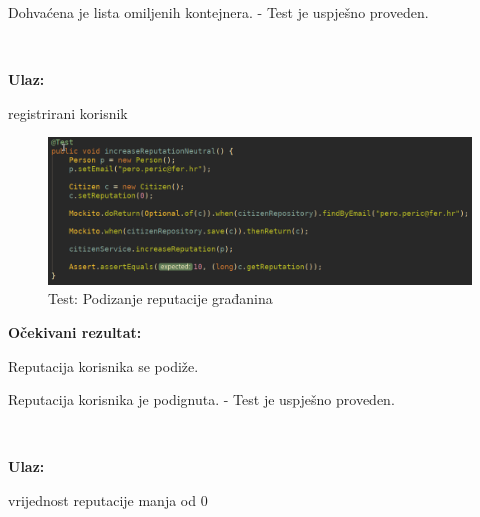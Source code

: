 		
			Dohvaćena je lista omiljenih kontejnera. - Test je uspješno proveden.			


					
			
			\noindent {}
			
			\
			
			\noindent \textbf{Ulaz:}
			
			\begin{packed_enum}
				\item registrirani korisnik
					
				
			\end{packed_enum}

			\begin{figure}[H]
					\includegraphics[scale=0.57]{figures/Screenshot_20200115_223819.PNG}
					\centering
					\caption{Test: Podizanje reputacije građanina}
					\label{fig:Podizanje reputacije građanina}
				\end{figure}	
			
			\noindent \textbf{Očekivani rezultat:}
				\begin{packed_enum}
				\item Reputacija korisnika se podiže.
							
				
			\end{packed_enum}
			
		
			 Reputacija korisnika je podignuta. - Test je uspješno proveden.			


			
			
			\noindent {}
			
			\
			
			\noindent \textbf{Ulaz:}
			
			\begin{packed_enum}
				\item vrijednost reputacije manja od 0
					
				
			\end{packed_enum}

